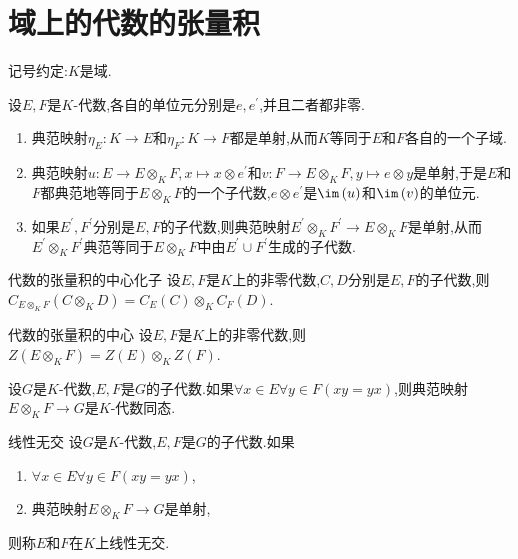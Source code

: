 \section{域上的代数的张量积}

记号约定:$K$是域.

\begin{proposition}{}{}
	设$E,F$是$K$-代数,各自的单位元分别是$e,e^{\prime}$,并且二者都非零.
	\begin{enumerate}
		\item 典范映射$\eta_{E}:K\to E$和$\eta_{F}:K\to F$都是单射,从而$K$等同于$E$和$F$各自的一个子域.
		\item 典范映射$u:E\to E\otimes_{K}F,x\mapsto x\otimes e^{\prime}$和$v:F\to E\otimes_{K}F,y\mapsto e\otimes y$是单射,于是$E$和$F$都典范地等同于$E\otimes_{K}F$的一个子代数,$e\otimes e^{\prime}$是$\im\left(u\right)$和$\im\left(v\right)$的单位元.
		\item 如果$E^{\prime},F^{\prime}$分别是$E,F$的子代数,则典范映射$E^{\prime}\otimes_{K}F^{\prime}\to E\otimes_{K}F$是单射,从而$E^{\prime}\otimes_{K}F^{\prime}$典范等同于$E\otimes_{K}F$中由$E^{\prime}\cup F^{\prime}$生成的子代数.
	\end{enumerate}
\end{proposition}

\begin{proposition}{代数的张量积的中心化子}{}
	设$E,F$是$K$上的非零代数,$C,D$分别是$E,F$的子代数,则$C_{E\otimes_{K}F}\left(C\otimes_{K}D\right)=C_{E}\left(C\right)\otimes_{K}C_{F}\left(D\right)$.
\end{proposition}

\begin{corollary}{代数的张量积的中心}{}
	设$E,F$是$K$上的非零代数,则$Z\left(E\otimes_{K}F\right)=Z\left(E\right)\otimes_{K}Z\left(F\right)$.
\end{corollary}

\begin{proposition}{}{}
	设$G$是$K$-代数,$E,F$是$G$的子代数.如果$\forall x\in E\forall y\in F\left(xy=yx\right)$,则典范映射$E\otimes_{K}F\to G$是$K$-代数同态.
\end{proposition}

\begin{definition}{线性无交}{}
	设$G$是$K$-代数,$E,F$是$G$的子代数.如果
	\begin{enumerate}
		\item $\forall x\in E\forall y\in F\left(xy=yx\right)$,
		\item 典范映射$E\otimes_{K}F\to G$是单射,
	\end{enumerate}
	则称$E$和$F$在$K$上线性无交.
\end{definition}

